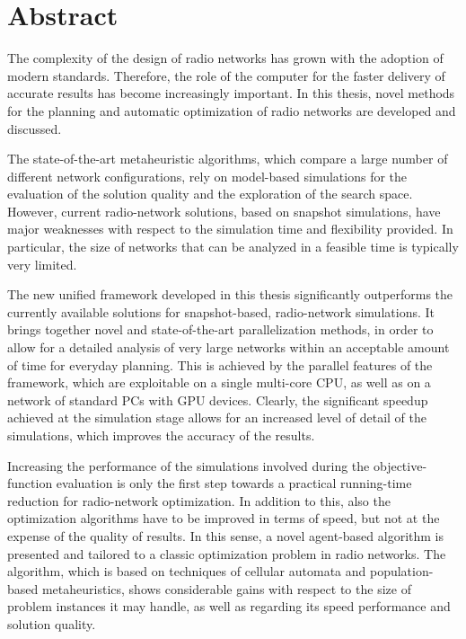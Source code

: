 
\chapter*{{\Large{\vspace{-2.3cm}Abstract}}}

\noindent {}
\fancyhead{}
\fancyfoot{}
\fancyhead[RO]{\thepage}
\fancyhead[LO]{}
\fancyhead[LE]{\thepage}

\noindent The complexity of the design of radio networks has grown
with the adoption of modern standards. Therefore, the role of the
computer for the faster delivery of accurate results has become increasingly
important. In this thesis, novel methods for the planning and automatic
optimization of radio networks are developed and discussed.

The state-of-the-art metaheuristic algorithms, which compare a large
number of different network configurations, rely on model-based simulations
for the evaluation of the solution quality and the exploration of
the search space. However, current radio-network solutions, based
on snapshot simulations, have major weaknesses with respect to the
simulation time and flexibility provided. In particular, the size
of networks that can be analyzed in a feasible time is typically very
limited.

The new unified framework developed in this thesis significantly outperforms
the currently available solutions for snapshot-based, radio-network
simulations. It brings together novel and state-of-the-art parallelization
methods, in order to allow for a detailed analysis of very large networks
within an acceptable amount of time for everyday planning. This is
achieved by the parallel features of the framework, which are exploitable
on a single multi-core CPU, as well as on a network of standard PCs
with GPU devices. Clearly, the significant speedup achieved at the
simulation stage allows for an increased level of detail of the simulations,
which improves the accuracy of the results.

Increasing the performance of the simulations involved during the
objective-function evaluation is only the first step towards a practical
running-time reduction for radio-network optimization. In addition
to this, also the optimization algorithms have to be improved in terms
of speed, but not at the expense of the quality of results. In this
sense, a novel agent-based algorithm is presented and tailored to
a classic optimization problem in radio networks. The algorithm, which
is based on techniques of cellular automata and population-based metaheuristics,
shows considerable gains with respect to the size of problem instances
it may handle, as well as regarding its speed performance and solution
quality.

